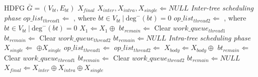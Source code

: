 \begin{algorithm}[ht!]
    {
        \caption{}
        \begin{algorithmic}[1]
            \Require    HDFG $\bar{G} = (V_{bt}, E_{bt})$
            \Ensure     $X_{final}$
            \State $X_{inter},X_{intra},X_{single}\Leftarrow NULL$       %
             \label{line:interws}
            \Comment \textit{Inter-tree scheduling phase}
            \State $op\_list_{thread1} \Leftarrow$ , where $bt\in V_{bt}\ |\ \textrm{deg}^-(bt) = 0$ 
            \EndIf
            \State $op\_list_{thread2} \Leftarrow$ , where $bt\in V_{bt}\ |\ \textrm{deg}^-(bt) = 0$
            \EndIf
            \State $X_{1} \Leftarrow X_{1}\oplus$ \label{line:intercon}
            \EndWhile \label{line:interwe}
             \label{line:interis}
            \State $bt_{remain} \Leftarrow$ 
            \State Clear $work\_queue_{thread1}$
            \State $bt_{remain} \Leftarrow$ 
            \State Clear $work\_queue_{thread2}$
            \Else
            \State $bt_{remain} \Leftarrow NULL$
            \EndIf \label{line:interie}
                \label{line:intra:ws}
            \Comment \textit{Intra-tree scheduling phase}
            \State $X_{single} \Leftarrow$  $\oplus X_{single}$
            \State $op\_list_{thread1} \Leftarrow$ 
            \State $op\_list_{thread2} \Leftarrow$ 
            \State $X_{body} \Leftarrow X_{body} \oplus$ 
            \State $bt_{remain} \Leftarrow$ 
            \State Clear $work\_queue_{thread1}$
            \State $bt_{remain} \Leftarrow$ 
            \State Clear $work\_queue_{thread2}$
            \Else
            \State $bt_{remain} \Leftarrow NULL$
            \EndIf
            \EndWhile   \label{line:intra:we}
            \State $X_{final} \Leftarrow X_{inter} \oplus X_{intra} \oplus X_{single}$
            \State {}
        \end{algorithmic}%
        \label{alg:sche}
    }
\end{algorithm}

